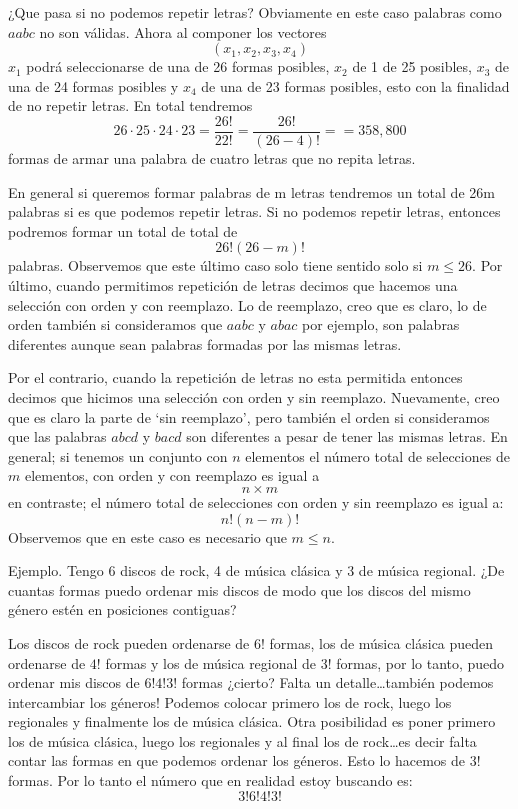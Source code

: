 \documentclass[14pt]{extreport}
\theoremstyle{definicion}
\theoremstyle{propiedad}
\begin{document}
¿Que pasa si no podemos repetir letras? Obviamente en este caso palabras como $aabc$ no son válidas. Ahora al componer los vectores
$$
  (x_1, x_2, x_3, x_4)
$$
$x_1$ podrá seleccionarse de una de 26 formas posibles, $x_2$ de 1 de 25 posibles, $x_3$ de una de 24 formas posibles y $x_4$ de una de 23 formas posibles, esto con la finalidad de no repetir letras. En total tendremos
$$
  26 \cdot 25 \cdot 24 \cdot 23 = \frac{26!}{22!} = \frac{26!}{(26 - 4)!} = = 358,800
$$
formas de armar una palabra de cuatro letras que no repita letras.

En general si queremos formar palabras de m letras tendremos un total de 26m palabras si es que podemos repetir letras. Si no podemos repetir letras, entonces podremos formar un total de total de
$$
  26! (26 - m)!
$$
palabras. Observemos que este último caso solo tiene sentido solo si $m \leq 26$. Por último, cuando permitimos repetición de letras decimos que hacemos una selección con orden y con reemplazo. Lo de reemplazo, creo que es claro, lo de orden también si consideramos que $aabc$ y $abac$ por ejemplo, son palabras diferentes aunque sean palabras formadas por las mismas letras.

Por el contrario, cuando la repetición de letras no esta permitida entonces decimos que hicimos una selección con orden y sin reemplazo. Nuevamente, creo que es claro la parte de `sin reemplazo', pero también el orden si consideramos que las palabras $abcd$ y $bacd$ son diferentes a pesar de tener las mismas letras. En general; si tenemos un conjunto con $n$ elementos el número total de selecciones de $m$ elementos, con orden y con reemplazo es igual a
$$
  n\times m
$$
en contraste; el número total de selecciones con orden y sin reemplazo es igual a:
$$
  n! (n - m)!
$$
Observemos que en este caso es necesario que $m \leq n$.

Ejemplo. Tengo 6 discos de rock, 4 de música clásica y 3 de música regional. ¿De cuantas formas puedo ordenar mis discos de modo que los discos del mismo género estén en posiciones contiguas?

Los discos de rock pueden ordenarse de $6!$ formas, los de música clásica pueden ordenarse de $4!$ formas y los de música regional de $3!$ formas, por lo tanto, puedo ordenar mis discos de $6!4!3!$ formas ¿cierto? Falta un detalle\dots también podemos intercambiar los géneros! Podemos colocar primero los de rock, luego los regionales y finalmente los de música clásica. Otra posibilidad es poner primero los de música clásica, luego los regionales y al final los de rock\dots es decir falta contar las formas en que podemos ordenar los géneros. Esto lo hacemos de $3!$ formas. Por lo tanto el número que en realidad estoy buscando es:
$$
  3!6!4!3!
$$
\end{document}
